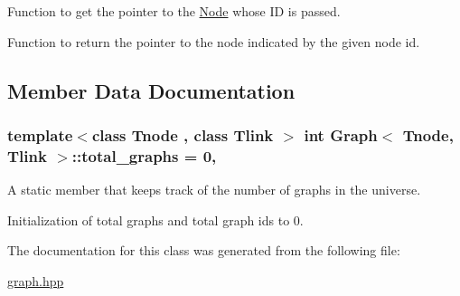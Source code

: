 Function to get the pointer to the \hyperlink{classNode}{Node} whose I\-D is passed. 

Function to return the pointer to the node indicated by the given node id. 

\subsection{Member Data Documentation}
\hypertarget{classGraph_a2222ebedfb7b3cd4f1bd6717a2c1b881}{
\subsubsection[{total\-\_\-graphs}]{\setlength{\rightskip}{0pt plus 5cm}template$<$class Tnode , class Tlink $>$ int {\bf Graph}$<$ Tnode, Tlink $>$\-::total\-\_\-graphs = 0\hspace{0.3cm}{\ttfamily [static]}, {\ttfamily [private]}}}\label{classGraph_a2222ebedfb7b3cd4f1bd6717a2c1b881}


A static member that keeps track of the number of graphs in the universe. 

Initialization of total graphs and total graph ids to 0. 

The documentation for this class was generated from the following file\-:\begin{DoxyCompactItemize}
\item 
\hyperlink{graph_8hpp}{graph.\-hpp}\end{DoxyCompactItemize}
